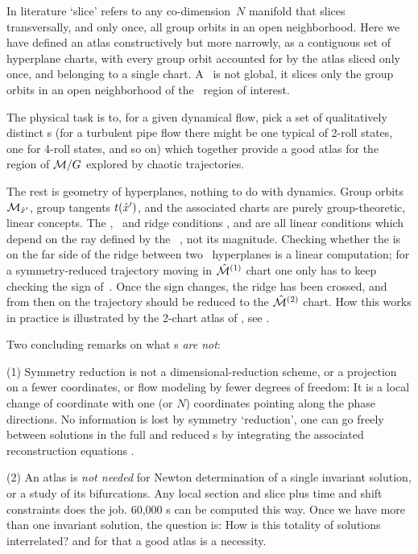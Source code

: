 \documentclass[aip,cha,reprint,
secnumarabic,
nofootinbib, tightenlines,
nobibnotes, showkeys, showpacs,
groupedaddress
]{revtex4-1}
\begin{document}
In literature `slice' refers to any
co-dimension~$N$ manifold that slices transversally, and only once, all
group orbits in an open neighborhood. Here we have defined an atlas
constructively but more narrowly, as a contiguous set of hyperplane
charts, with every group orbit accounted for by the atlas sliced only
once, and belonging to a single chart. A \slice\ is not global, it slices
only the group orbits in an open neighborhood of the \statesp\ region of
interest.

The physical task is to, for a given dynamical flow, pick a set of
qualitatively distinct {\template s} (for a turbulent pipe
flow there might be one typical of 2-roll states, one for 4-roll states, and so on)
which together provide a good atlas for the region of ${\cal M}/G$
explored by chaotic trajectories.

The rest is geometry of hyperplanes, nothing to do with dynamics. Group
orbits ${\cal M}_{{\hat{x}'}}$, group tangents $t({\hat{x}'})$, and the
associated charts are purely group-theoretic, linear concepts. The
\slice, \chartBord\ and ridge conditions ,
 and  are all linear conditions which
depend on the ray defined by the \template\ \slicep, not its magnitude.
Checking whether the {\chartBord} is on the far side of the ridge between
two \slice\ hyperplanes is a linear computation; for a symmetry-reduced
trajectory moving in $\hat{\cal M}{}^{(1)}$ chart one only has to keep checking
the sign of
\beq
{}
\,.
Once the sign changes, the ridge has been crossed, and from then on
the trajectory should be reduced to the $\hat{\cal M}{}^{(2)}$ chart.
How this works in practice is illustrated by the 2-chart atlas of
\cLe, see .

Two concluding remarks on what \slice s \emph{are not}:

(1) Symmetry reduction is not a dimensional-reduction scheme, or a
projection on a fewer coordinates, or flow modeling by fewer degrees of
freedom: It is a local change of coordinate with one (or $N$)
coordinates pointing along the phase directions. No information is lost
by symmetry `reduction', one can go freely between solutions in the full
and reduced \statesp s by integrating the associated {reconstruction
equations} .

(2) An atlas is \emph{not needed} for Newton determination of a single
invariant solution, or a study of its bifurcations. Any local
section and slice plus time and shift constraints does the job. 60,000
\rpo s can be computed this way. Once we have more than one
invariant solution, the question is: How is this totality of solutions
interrelated? and for that a good atlas is a necessity.
\end{document}
